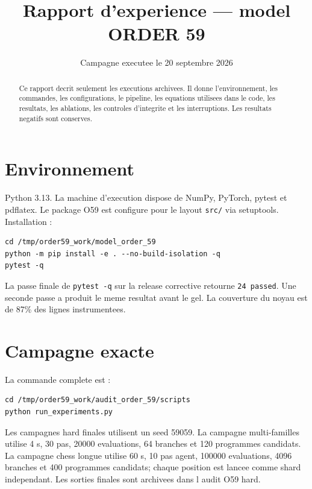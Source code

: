 \documentclass[11pt,a4paper]{article}
\title{Rapport d'experience --- model ORDER 59}
\author{Campagne executee le 20 septembre 2026}
\date{}
\begin{document}
\maketitle
\tableofcontents
\newpage

\begin{abstract}
Ce rapport decrit seulement les executions archivees. Il donne l'environnement, les commandes, les configurations, le pipeline, les equations utilisees dans le code, les resultats, les ablations, les controles d'integrite et les interruptions. Les resultats negatifs sont conserves.
\end{abstract}

\section{Environnement}
Python 3.13. La machine d'execution dispose de NumPy, PyTorch, pytest et pdflatex. Le package O59 est configure pour le layout \texttt{src/} via setuptools. Installation :
\begin{verbatim}
cd /tmp/order59_work/model_order_59
python -m pip install -e . --no-build-isolation -q
pytest -q
\end{verbatim}
La passe finale de \texttt{pytest -q} sur la release corrective retourne \texttt{24 passed}. Une seconde passe a produit le meme resultat avant le gel. La couverture du noyau est de 87\% des lignes instrumentees.

\section{Campagne exacte}
La commande complete est :
\begin{verbatim}
cd /tmp/order59_work/audit_order_59/scripts
python run_experiments.py
\end{verbatim}
Les campagnes hard finales utilisent un seed 59059. La campagne multi-familles utilise 4 s, 30 pas, 20000 evaluations, 64 branches et 120 programmes candidats. La campagne chess longue utilise 60 s, 10 pas agent, 100000 evaluations, 4096 branches et 400 programmes candidats; chaque position est lancee comme shard independant. Les sorties finales sont archivees dans l audit O59 hard.
\end{document}
